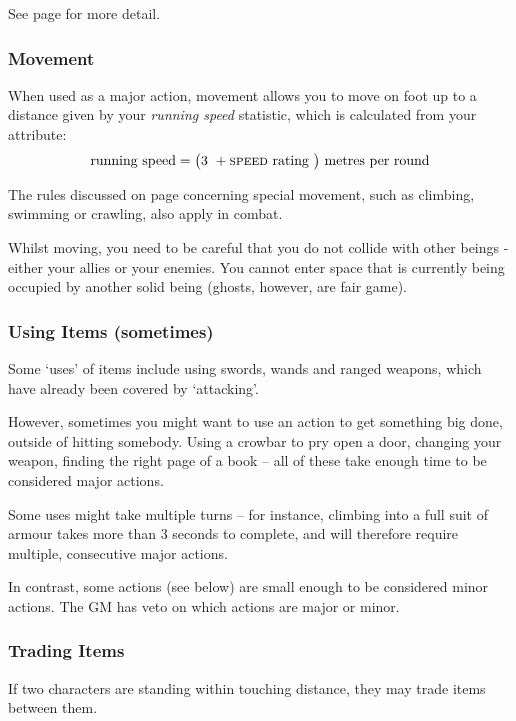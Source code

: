 	See page \pageref{S:Defence} for more detail.
	
 \subsubsection{Movement}
 
 When used as a major action, movement allows you to move on foot up to a distance given by your {\it running speed} statistic, which is calculated from your  attribute:
\small
$$ \text{running speed} = \big(\text{3 } + \text{\textsc{speed} rating }\big) \text{ metres per round} $$  
\normalsize

The rules discussed on page \pageref{S:SpecialMovement} concerning special movement, such as climbing, swimming or crawling, also apply in combat. 

Whilst moving, you need to be careful that you do not collide with other beings - either your allies or your enemies. You cannot enter space that is currently being occupied by another solid being (ghosts, however, are fair game). 

 \subsubsection{Using Items (sometimes)}
 
Some `uses' of items include using swords, wands and ranged weapons, which have already been covered by `attacking'. 

However, sometimes you might want to use an action to get something big done, outside of hitting somebody. Using a crowbar to pry open a door, changing your weapon, finding the right page of a book -- all of these take enough time to be considered major actions. 

Some uses might take multiple turns -- for instance, climbing into a full suit of armour takes more than 3 seconds to complete, and will therefore require multiple, consecutive major actions. 

In contrast, some actions (see below) are small enough to be considered minor actions. The GM has veto on which actions are major or minor. 

\subsubsection{Trading Items}

If two characters are standing within touching distance, they may trade items between them. 

